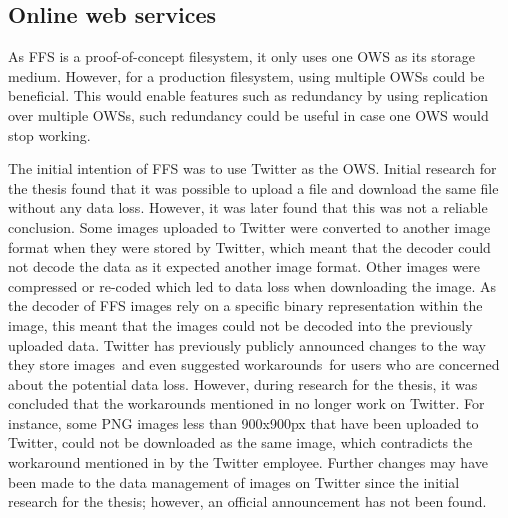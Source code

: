 \subsection{Online web services}
\label{subsec:ffs_ows}
As \gls{FFS} is a \mbox{proof-of-concept} filesystem, it only uses one \gls{OWS} as its storage medium. However, for a production filesystem, using multiple \gls{OWS}s could be beneficial. This would enable features such as redundancy by using replication over multiple \gls{OWS}s, such redundancy could be useful in case one \gls{OWS} would stop working.

The initial intention of \gls{FFS} was to use Twitter as the \gls{OWS}. Initial research for the thesis found that it was possible to upload a file and download the same file without any data loss. However, it was later found that this was not a reliable conclusion. Some images uploaded to Twitter were converted to another image format when they were stored by Twitter, which meant that the decoder could not decode the data as it expected another image format. Other images were compressed or \mbox{re-coded} which led to data loss when downloading the image. As the decoder of \gls{FFS} images rely on a specific binary representation within the image, this meant that the images could not be decoded into the previously uploaded data. Twitter has previously publicly announced changes to the way they store images\,\cite{nolanobrienUpcomingChangesPNG2018} and even suggested workarounds\,\cite{nolanobrienFeedbackUpcomingChanges2019} for users who are concerned about the potential data loss. However, during research for the thesis, it was concluded that the workarounds mentioned in \cite{nolanobrienFeedbackUpcomingChanges2019} no longer work on Twitter. For instance, some PNG images less than 900x900px that have been uploaded to Twitter, could not be downloaded as the same image, which contradicts the workaround mentioned in \cite{nolanobrienFeedbackUpcomingChanges2019} by the Twitter employee. Further changes may have been made to the data management of images on Twitter since the initial research for the thesis; however, an official announcement has not been found.

